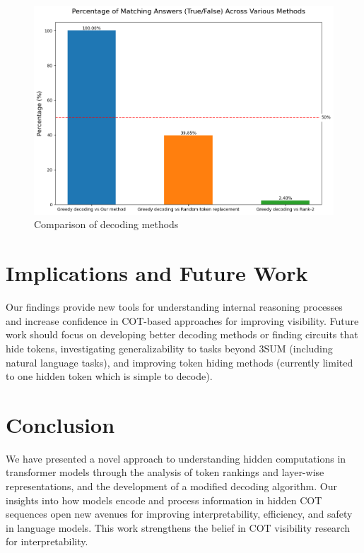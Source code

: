 \documentclass[10pt,a4paper]{article}
\begin{document}
\begin{figure}[h]
\centering
\includegraphics[width=\textwidth]{token_comparison_percentages.png}
\caption{Comparison of decoding methods}
\label{fig:decoding_comparison}
\end{figure}

\section{Implications and Future Work}
Our findings provide new tools for understanding internal reasoning processes and increase confidence in COT-based approaches for improving visibility. Future work should focus on developing better decoding methods or finding circuits that hide tokens, investigating generalizability to tasks beyond 3SUM (including natural language tasks), and improving token hiding methods (currently limited to one hidden token which is simple to decode).

\clearpage
\section{Conclusion}
We have presented a novel approach to understanding hidden computations in transformer models through the analysis of token rankings and layer-wise representations, and the development of a modified decoding algorithm. Our insights into how models encode and process information in hidden COT sequences open new avenues for improving interpretability, efficiency, and safety in language models. This work strengthens the belief in COT visibility research for interpretability.
\end{document}
